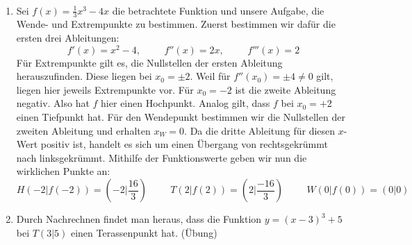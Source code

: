 \documentclass[ngerman, 12pt]{nssheetxea}
\begin{document}
\begin{example} \
\begin{enumerate}
\item Sei $f(x)=\frac{1}{3}x^3-4x$ die betrachtete Funktion und unsere Aufgabe, die Wende- und Extrempunkte zu bestimmen. Zuerst bestimmen wir dafür die ersten drei Ableitungen:
\[ f'(x)=x^2-4,\hspace{1cm} f''(x)=2x, \hspace{1cm} f'''(x)=2\]
Für Extrempunkte gilt es, die Nullstellen der ersten Ableitung herauszufinden. Diese liegen bei $x_0=\pm 2$. Weil für $f''(x_0) = \pm 4 \neq 0$ gilt, liegen hier jeweils Extrempunkte vor. Für $x_0=-2$ ist die zweite Ableitung negativ. Also hat $f$ hier einen Hochpunkt. Analog gilt, dass $f$ bei $x_0=+2$ einen Tiefpunkt hat. Für den Wendepunkt bestimmen wir die Nullstellen der zweiten Ableitung und erhalten $x_W=0$. Da die dritte Ableitung für diesen $x$-Wert positiv ist, handelt es sich um einen Übergang von rechtsgekrümmt nach linksgekrümmt. Mithilfe der Funktionswerte geben wir nun die wirklichen Punkte an: \\
\[ H(-2|f(-2)) = (-2|\frac{16}{3}) \hspace{1cm} T(2|f(2)) = (2|\frac{-16}{3}) \hspace{1cm} W(0|f(0)) = (0|0)  \]
\begin{center}
\end{center}
\item Durch Nachrechnen findet man heraus, dass die Funktion $y=(x-3)^3+5$ bei $T(3|5)$ einen Terassenpunkt hat. (Übung)
\end{enumerate}
\end{example}
\end{document}
